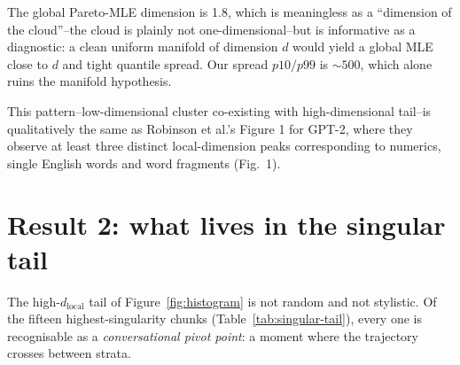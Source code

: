 \documentclass[11pt,a4paper]{article}
\theoremstyle{definition}
\newcommand{\dlocal}{d_{\mathrm{local}}}
\begin{document}
The global Pareto-MLE dimension is 1.8, which is meaningless as a
``dimension of the cloud''--the cloud is plainly not one-dimensional--but
is informative as a diagnostic: a clean uniform manifold of dimension
$d$ would yield a global MLE close to $d$ and tight quantile spread. Our
spread $p10 / p99$ is $\sim 500$, which alone ruins the manifold
hypothesis.

This pattern--low-dimensional cluster co-existing with high-dimensional
tail--is qualitatively the same as Robinson et al.'s Figure 1 for GPT-2,
where they observe at least three distinct local-dimension peaks
corresponding to numerics, single English words and word fragments
\cite{robinson2025token} (Fig.~1).

\section{Result 2: what lives in the singular tail}
\label{sec:result2}

The high-$\dlocal$ tail of Figure~\ref{fig:histogram} is not random and
not stylistic. Of the fifteen highest-singularity chunks
(Table~\ref{tab:singular-tail}), every one is recognisable as a
\emph{conversational pivot point}: a moment where the trajectory crosses
between strata.
\end{document}
